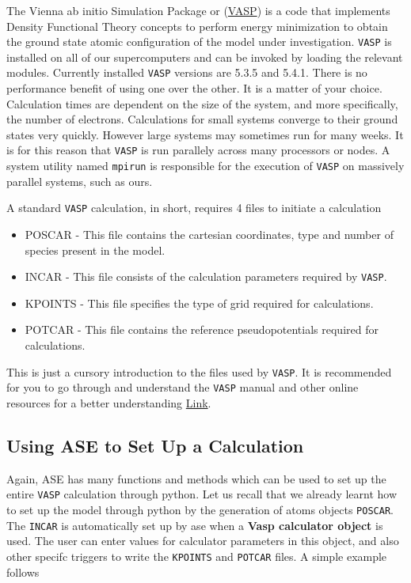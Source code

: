 \documentclass[11pt]{article}
\begin{document}
The Vienna ab initio Simulation Package or (\href{https://www.vasp.at/}{VASP}) is a code that implements Density Functional Theory concepts to perform energy minimization to obtain the ground state atomic configuration of the model under investigation. \texttt{VASP} is installed on all of our supercomputers and can be invoked by loading the relevant modules. Currently installed \texttt{VASP} versions are 5.3.5 and 5.4.1. There is no performance benefit of using one over the other. It is a matter of your choice. Calculation times are dependent on the size of the system, and more specifically, the number of electrons. Calculations for small systems converge to their ground states very quickly. However large systems may sometimes run for many weeks. It is for this reason that \texttt{VASP} is run parallely across many processors or nodes. A system utility named \texttt{mpirun} is responsible for the execution of \texttt{VASP} on massively parallel systems, such as ours.

A standard \texttt{VASP} calculation, in short, requires 4 files to initiate a calculation
\begin{itemize}
\item POSCAR - This file contains the cartesian coordinates, type and number of species present in the model.
\item INCAR - This file consists of the calculation parameters required by \texttt{VASP}.
\item KPOINTS - This file specifies the type of grid required for calculations.
\item POTCAR - This file contains the reference pseudopotentials required for calculations.
\end{itemize}

This is just a cursory introduction to the files used by \texttt{VASP}. It is recommended for you to go through and understand the \texttt{VASP} manual and other online resources for a better understanding \href{https://www.vasp.at/index.php/documentation}{Link}. 

\subsection{Using ASE to Set Up a Calculation}
\label{sec:orgaf44885}
Again, ASE has many functions and methods which can be used to set up the entire \texttt{VASP} calculation through python. Let us recall that we already learnt how to set up the model through python by the generation of atoms objects \texttt{POSCAR}. The \texttt{INCAR} is automatically set up by ase when a \textbf{Vasp calculator object} is used. The user can enter values for calculator parameters in this object, and also other specifc triggers to write the \texttt{KPOINTS} and \texttt{POTCAR} files. A simple example follows
\end{document}
